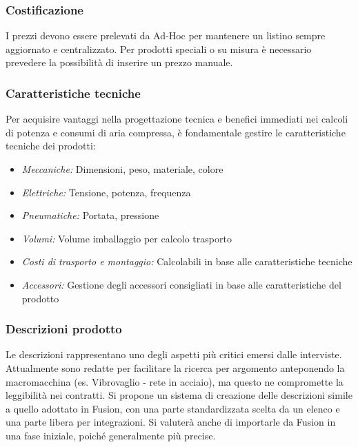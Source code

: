 \documentclass[12pt, a4paper]{article}
\begin{document}
\subsubsection{Costificazione}

I prezzi devono essere prelevati da Ad-Hoc per mantenere un listino sempre aggiornato e centralizzato.
Per prodotti speciali o su misura è necessario prevedere la possibilità di inserire un prezzo manuale.

\subsubsection{Caratteristiche tecniche}

Per acquisire vantaggi nella progettazione tecnica e benefici immediati nei calcoli di potenza e consumi di aria compressa, è fondamentale gestire le caratteristiche tecniche dei prodotti:

\begin{itemize}
      \item \textit{Meccaniche:} Dimensioni, peso, materiale, colore
      \item \textit{Elettriche:} Tensione, potenza, frequenza
      \item \textit{Pneumatiche:} Portata, pressione
      \item \textit{Volumi:} Volume imballaggio per calcolo trasporto
      \item \textit{Costi di trasporto e montaggio:} Calcolabili in base alle caratteristiche tecniche
      \item \textit{Accessori:} Gestione degli accessori consigliati in base alle caratteristiche del prodotto
\end{itemize}

\subsubsection{Descrizioni prodotto}

Le descrizioni rappresentano uno degli aspetti più critici emersi dalle interviste.
Attualmente sono redatte per facilitare la ricerca per argomento anteponendo la macromacchina (es. Vibrovaglio - rete in acciaio), ma questo ne compromette la leggibilità nei contratti.
Si propone un sistema di creazione delle descrizioni simile a quello adottato in Fusion, con una parte standardizzata scelta da un elenco e una parte libera per integrazioni.
Si valuterà anche di importarle da Fusion in una fase iniziale, poiché generalmente più precise.
\end{document}
